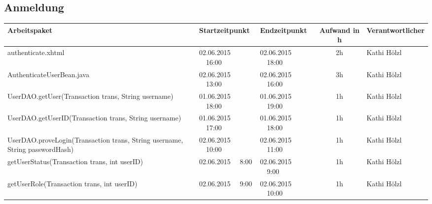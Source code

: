 \begin{landscape}
\subsection{Anmeldung}
\begin{tabular}{|p{10.3cm}|p{3.2cm}|p{3.2cm}|c|p{3.5cm}|}
	\hline  \textbf{Arbeitspaket} & \textbf{Startzeitpunkt} & \textbf{Endzeitpunkt} & \textbf{Aufwand in h} & \textbf{Verantwortlicher} \\ 
	\hline   authenticate.xhtml                                   & 02.06.2015 \ \ 16:00     & 02.06.2015 \ \ 18:00     &      2h               & Kathi Hölzl\\
	\hline   AuthenticateUserBean.java                            & 02.06.2015 \ \ 13:00     & 02.06.2015 \ \ 16:00     &      3h               & Kathi Hölzl\\
	\hline   UserDAO.getUser(Transaction trans, String username)  & 01.06.2015 \ \ 18:00     & 01.06.2015 \ \ 19:00     &      1h               & Kathi Hölzl\\
	\hline   UserDAO.getUserID(Transaction trans, String username)& 01.06.2015 \ \ 17:00     & 01.06.2015 \ \ 18:00     &      1h               & Kathi Hölzl\\
	\hline   UserDAO.proveLogin(Transaction trans, String username, String passwordHash)& 02.06.2015 \ \ 10:00     & 02.06.2015 \ \ 11:00     &      1h               & Kathi Hölzl\\
	\hline   getUserStatus(Transaction trans, int userID)         & 02.06.2015 \ \ 8:00     & 02.06.2015 \ \ 9:00     &      1h               & Kathi Hölzl\\
	\hline   getUserRole(Transaction trans, int userID)           & 02.06.2015 \ \ 9:00     & 02.06.2015 \ \ 10:00     &      1h               & Kathi Hölzl\\
	\hline 
\end{tabular} \ \\
\ \\


\end{landscape}
